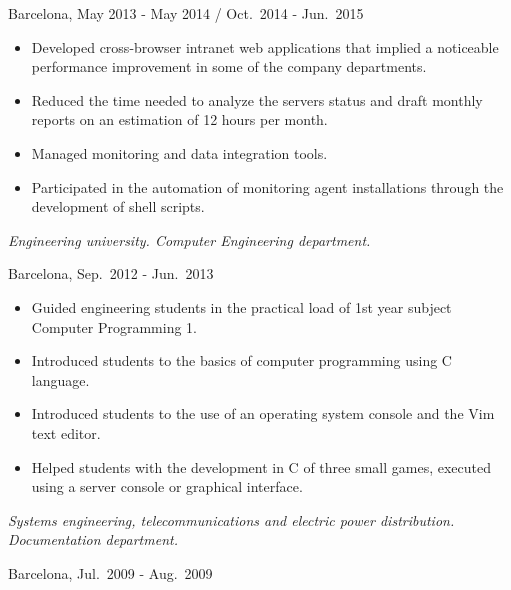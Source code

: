 \begin{description}[itemsep=15pt]
        Barcelona, May 2013 - May 2014 / Oct.\ 2014 - Jun.\ 2015
        \begin{itemize}[itemsep=0pt]
            \item Developed cross-browser intranet web applications that implied a noticeable performance improvement in some of the company departments.
            \item Reduced the time needed to analyze the servers status and draft monthly reports on an estimation of 12 hours per month.
            \item Managed monitoring and data integration tools.
            \item Participated in the automation of monitoring agent installations through the development of shell scripts.
        \end{itemize}

    \item[\href{http://www.salleurl.edu}{La Salle Campus}, Teaching Assistant in Computer Programming 1] \hfill

        \emph{Engineering university. Computer Engineering department.}

        Barcelona, Sep.\ 2012 - Jun.\ 2013
        \begin{itemize}[itemsep=0pt]
            \item Guided engineering students in the practical load of 1st year subject Computer Programming 1.
            \item Introduced students to the basics of computer programming using C language.
            \item Introduced students to the use of an operating system console and the Vim text editor.
            \item Helped students with the development in C of three small games, executed using a server console or graphical interface.
        \end{itemize}

    \item[\href{http://www.itc2.com}{ITC-2}, Technical Assistant] \hfill

        \emph{Systems engineering, telecommunications and electric power distribution. Documentation department.}

        Barcelona, Jul.\ 2009 - Aug.\ 2009


\end{description}
